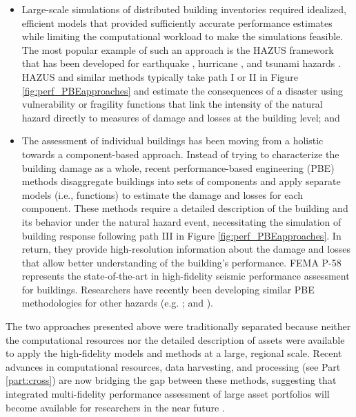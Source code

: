 \begin{itemize}
    \item Large-scale simulations of distributed building inventories required idealized, efficient models that provided sufficiently accurate performance estimates while limiting the computational workload to make the simulations feasible. The most popular example of such an approach is the HAZUS framework that has been developed for earthquake \citep{fema2018earthquaketechnical}, hurricane \citep{fema2018hurricaneuser}, and tsunami hazards \citep{fema2017tsunamitechnical}. HAZUS and similar methods typically take path I or II in Figure \ref{fig:perf_PBEapproaches} and estimate the consequences of a disaster using vulnerability or fragility functions that link the intensity of the natural hazard directly to measures of damage and losses at the building level; and
    \vspace{2mm}
    \item The assessment of individual buildings has been moving from a holistic towards a component-based approach. Instead of trying to characterize the building damage as a whole, recent performance-based engineering (PBE) methods disaggregate buildings into sets of components and apply separate models (i.e., functions) to estimate the damage and losses for each component. These methods require a detailed description of the building and its behavior under the natural hazard event, necessitating the simulation of building response following path III in Figure \ref{fig:perf_PBEapproaches}. In return, they provide high-resolution information about the damage and losses that allow better understanding of the building's performance. FEMA P-58 \citep{atc2018p-58-1} represents the state-of-the-art in high-fidelity seismic performance assessment for buildings. Researchers have recently been developing similar PBE methodologies for other hazards (e.g. \cite{barbato2013performancebased, ouyang2020performance}; and  \cite{attary2017performancebased}).
\end{itemize}

The two approaches presented above were traditionally separated because neither the computational resources nor the detailed description of assets were available to apply the high-fidelity models and methods at a large, regional scale. Recent advances in computational resources, data harvesting, and processing (see Part \ref{part:cross}) are now bridging the gap between these methods, suggesting that integrated multi-fidelity performance assessment of large asset portfolios will become available for researchers in the near future \citep{deierlein2020cloud}.

